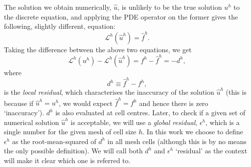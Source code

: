 The solution we obtain numerically, $\hat{u}$, is unlikely to be the true solution $u^h$ to the discrete equation, and applying the PDE operator on the former gives the following, slightly different, equation:
\begin{equation}\label{eq:general_pde_numerical}
    \mathcal{L}^h(\hat{u}^h) = \hat{f}^h.
\end{equation}
Taking the difference between the above two equations, we get
\begin{equation}\label{eq:numerical_error}
    \mathcal{L}^h({u}^h) - \mathcal{L}^h(\hat{u}^h) = f^h-\hat{f}^h = -d^h,
\end{equation}
where 
\begin{equation}\label{eq:residual_d}
    d^h \equiv \hat{f}^h-f^h,
\end{equation}
is the {\it local residual}, which characterises the inaccuracy of the solution $\hat{u}^h$ (this is because if $\hat{u}^h=u^h$, we would expect $\hat{f}^h=f^h$ and hence there is zero `inaccuracy'). $d^h$ is also evaluated at cell centres. Later, to check if a given set of numerical solution $\hat{u}^h$ is acceptable, we will use a \textit{global residual}, $\epsilon^h$, which is a single number for the given mesh of cell size $h$. In this work we choose to define $\epsilon^h$ as the root-mean-squared of $d^h$ in all mesh cells (although this is by no means the only possible definition). We will call both $d^h$ and $\epsilon^h$ `residual' as the context will make it clear which one is referred to.

